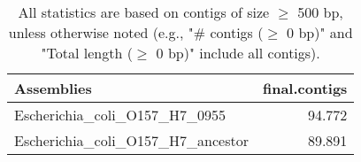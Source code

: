 \documentclass[12pt,a4paper]{article}
\begin{document}
\begin{table}[ht]
\begin{center}
\caption{All statistics are based on contigs of size $\geq$ 500 bp, unless otherwise noted (e.g., "\# contigs ($\geq$ 0 bp)" and "Total length ($\geq$ 0 bp)" include all contigs).}
\begin{tabular}{|l*{1}{|r}|}
\hline
Assemblies & final.contigs \\ \hline
Escherichia\_coli\_O157\_H7\_0955 & 94.772 \\ \hline
Escherichia\_coli\_O157\_H7\_ancestor & 89.891 \\ \hline
\end{tabular}
\end{center}
\end{table}
\end{document}
